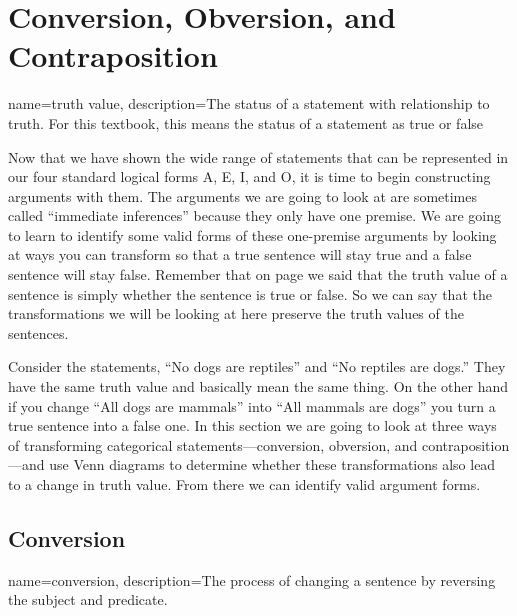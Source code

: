 

\section{Conversion, Obversion, and Contraposition}
\label{sec:conv_obv_cont}

{
  name=truth value,
  description={The status of a statement with relationship to truth. For  this textbook, this means the status of a statement as true or false}
}

Now that we have shown the wide range of statements that can be represented in our four standard logical forms A, E, I, and O, it is time to begin constructing arguments with them. The arguments we are going to look at are sometimes called ``immediate inferences'' because they only have one premise. We are going to learn to identify some valid forms of these one-premise arguments by looking at ways you can transform so that a true sentence will stay true and a false sentence will stay false. Remember that on page \pageref{def:Truth_value} we said that the \gls{truth value} of a sentence is simply whether the sentence is true or false. So we can say that the transformations we will be looking at here preserve the truth values of the sentences.

Consider the statements, ``No dogs are reptiles'' and ``No reptiles are dogs.'' They have the same truth value and basically mean the same thing. On the other hand if you change ``All dogs are mammals'' into ``All mammals are dogs'' you turn a true sentence into a false one. In this section we are going to look at three ways of transforming categorical statements---conversion, obversion, and contraposition---and use Venn diagrams to determine whether these transformations also lead to a change in truth value. From there we can identify valid argument forms.

\subsection{Conversion}

{
name=conversion,
description={The process of changing a sentence by reversing the subject and predicate.}
}


